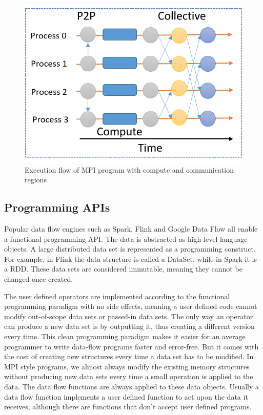 \documentclass[conference]{IEEEtran}
\begin{document}
\begin{figure}
    \centering
    \includegraphics[width=0.7\columnwidth]{images/mpi-flow.png}
    \caption{Execution flow of MPI program with compute and communication regions}
    \label{fig:execution_graph}
\end{figure}

\subsection{Programming APIs}

Popular data flow engines such as Spark, Flink and Google Data Flow all enable a functional programming API. The data is abstracted as high level language objects. A large distributed data set is represented as a programming construct. For example, in Flink the data structure is called a DataSet, while in Spark it is a RDD. These data sets are considered immutable, meaning they cannot be changed once created. 

The user defined operators are implemented according to the functional programming paradigm with no side effects, meaning a user defined code cannot modify out-of-scope data sets or passed-in data sets. The only way an operator can produce a new data set is by outputting it, thus creating a different version every time. This clean programming paradigm makes it easier for an average programmer to write data-flow programs faster and error-free. But it comes with the cost of creating new structures every time a data set has to be modified. In MPI style programs, we almost always modify the existing memory structures without producing new data sets every time a small operation is applied to the data. The data flow functions are always applied to these data objects. Usually a data flow function implements a user defined function to act upon the data it receives, although there are functions that don't accept user defined programs.
\end{document}
